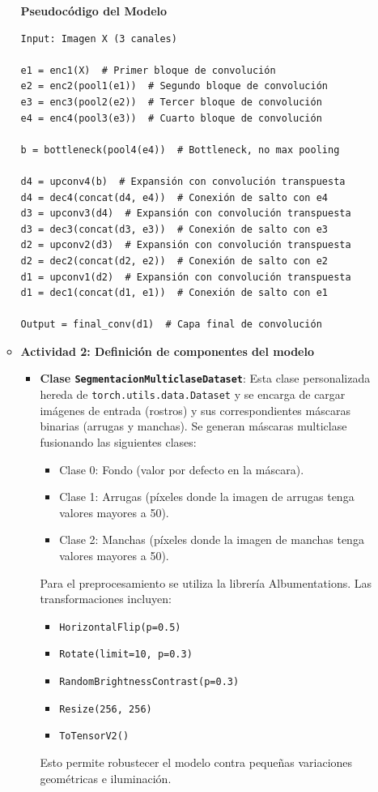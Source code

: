 \begin{enumerate}
\begin{itemize}
\textbf{Pseudocódigo del Modelo}

\begin{verbatim}
Input: Imagen X (3 canales)

e1 = enc1(X)  # Primer bloque de convolución
e2 = enc2(pool1(e1))  # Segundo bloque de convolución
e3 = enc3(pool2(e2))  # Tercer bloque de convolución
e4 = enc4(pool3(e3))  # Cuarto bloque de convolución

b = bottleneck(pool4(e4))  # Bottleneck, no max pooling

d4 = upconv4(b)  # Expansión con convolución transpuesta
d4 = dec4(concat(d4, e4))  # Conexión de salto con e4
d3 = upconv3(d4)  # Expansión con convolución transpuesta
d3 = dec3(concat(d3, e3))  # Conexión de salto con e3
d2 = upconv2(d3)  # Expansión con convolución transpuesta
d2 = dec2(concat(d2, e2))  # Conexión de salto con e2
d1 = upconv1(d2)  # Expansión con convolución transpuesta
d1 = dec1(concat(d1, e1))  # Conexión de salto con e1

Output = final_conv(d1)  # Capa final de convolución
\end{verbatim}


  \item\textbf{Actividad 2: Definición de componentes del modelo}
  \begin{itemize}
    \item \textbf{Clase \texttt{SegmentacionMulticlaseDataset}}: Esta clase personalizada hereda de \texttt{torch.utils.data.Dataset} y se encarga de cargar imágenes de entrada (rostros) y sus correspondientes máscaras binarias (arrugas y manchas). Se generan máscaras multiclase fusionando las siguientes clases:
    \begin{itemize}
        \item Clase 0: Fondo (valor por defecto en la máscara).
        \item Clase 1: Arrugas (píxeles donde la imagen de arrugas tenga valores mayores a 50).
        \item Clase 2: Manchas (píxeles donde la imagen de manchas tenga valores mayores a 50).
    \end{itemize}
    Para el preprocesamiento se utiliza la librería Albumentations. Las transformaciones incluyen:
    \begin{itemize}
        \item \texttt{HorizontalFlip(p=0.5)}
        \item \texttt{Rotate(limit=10, p=0.3)}
        \item \texttt{RandomBrightnessContrast(p=0.3)}
        \item \texttt{Resize(256, 256)}
        \item \texttt{ToTensorV2()}
    \end{itemize}
    Esto permite robustecer el modelo contra pequeñas variaciones geométricas e iluminación.


\end{itemize}
\end{itemize}
\end{enumerate}
